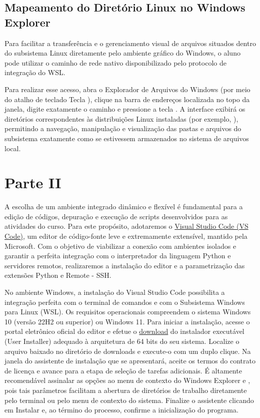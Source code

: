\subsection*{Mapeamento do Diretório Linux no Windows Explorer}

Para facilitar a transferência e o gerenciamento visual de arquivos situados dentro do subsistema Linux diretamente pelo ambiente gráfico do Windows, o aluno pode utilizar o caminho de rede nativo disponibilizado pelo protocolo de integração do WSL.

Para realizar esse acesso, abra o Explorador de Arquivos do Windows (por meio do atalho de teclado Tecla ), clique na barra de endereços localizada no topo da janela, digite exatamente o caminho  e pressione a tecla . A interface exibirá os diretórios correspondentes às distribuições Linux instaladas (por exemplo, ), permitindo a navegação, manipulação e visualização das pastas e arquivos do subsistema exatamente como se estivessem armazenados no sistema de arquivos local.


\section*{Parte II}

A escolha de um ambiente integrado dinâmico e flexível é fundamental para a edição de códigos, depuração e execução de scripts desenvolvidos para as atividades do curso. Para este propósito, adotaremos o \href{https://code.visualstudio.com}{Visual Studio Code (VS Code)}, um editor de código-fonte leve e extremamente extensível, mantido pela Microsoft.
Com o objetivo de viabilizar a conexão com ambientes isolados e garantir a perfeita integração com o interpretador da linguagem Python e servidores remotos, realizaremos a instalação do editor e a parametrização das extensões Python e Remote - SSH.

No ambiente Windows, a instalação do Visual Studio Code possibilita a integração perfeita com o terminal de comandos e com o Subsistema Windows para Linux (WSL). Os requisitos operacionais compreendem o sistema Windows 10 (versão 22H2 ou superior) ou Windows 11.
Para iniciar a instalação, acesse o portal eletrônico oficial do editor e efetue o \href{https://code.visualstudio.com/download?_exp_download=fb315fc982}{download} do instalador executável (User Installer) adequado à arquitetura de 64 bits do seu sistema. Localize o arquivo baixado no diretório de downloads e execute-o com um duplo clique. Na janela do assistente de instalação que se apresentará, aceite os termos do contrato de licença e avance para a etapa de seleção de tarefas adicionais. É altamente recomendável assinalar as opções  ao menu de contexto do Windows Explorer e , pois tais parâmetros facilitam a abertura de diretórios de trabalho diretamente pelo terminal ou pelo menu de contexto do sistema. Finalize o assistente clicando em Instalar e, ao término do processo, confirme a inicialização do programa.


